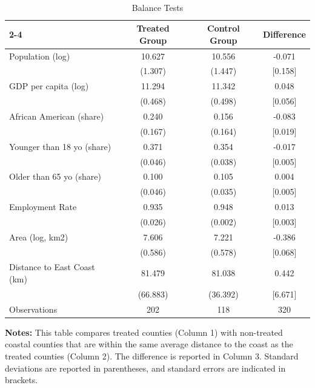 \documentclass{article}
\begin{document}
\begin{enumerate}
\begin{table}[b!]
\begin{center}
\caption{\sc Balance Tests}\\\vspace{.25cm}
\begin{tabular}{l|ccc|}
\cline{2-4}
 & Treated Group & Control Group & Difference \\ \hline
\multicolumn{1}{|l|}{Population (log)} & 10.627 & 10.556 & -0.071 \\
\multicolumn{1}{|l|}{} & (1.307) & (1.447) & {[}0.158{]} \\
\multicolumn{1}{|l|}{GDP per capita (log)} & 11.294 & 11.342 & 0.048 \\
\multicolumn{1}{|l|}{} & (0.468) & (0.498) & {[}0.056{]} \\
\multicolumn{1}{|l|}{African American (share)} & 0.240 & 0.156 & -0.083 \\
\multicolumn{1}{|l|}{} & (0.167) & (0.164) & {[}0.019{]} \\
\multicolumn{1}{|l|}{Younger than 18 yo (share)} & 0.371 & 0.354 & -0.017 \\
\multicolumn{1}{|l|}{} & (0.046) & (0.038) & {[}0.005{]} \\
\multicolumn{1}{|l|}{Older than 65 yo (share)} & 0.100 & 0.105 & 0.004 \\
\multicolumn{1}{|l|}{} & (0.046) & (0.035) & {[}0.005{]} \\
\multicolumn{1}{|l|}{Employment Rate} & 0.935 & 0.948 & 0.013 \\
\multicolumn{1}{|l|}{} & (0.026) & (0.002) & {[}0.003{]} \\
\multicolumn{1}{|l|}{Area (log, km2)} & 7.606 & 7.221 & -0.386 \\
\multicolumn{1}{|l|}{} & (0.586) & (0.578) & {[}0.068{]} \\
\multicolumn{1}{|l|}{Distance to East Coast (km)} & 81.479 & 81.038 & 0.442 \\
\multicolumn{1}{|l|}{} & (66.883) & (36.392) & {[}6.671{]} \\ \hline
\multicolumn{1}{|l|}{Observations} & 202 & 118 & 320 \\ \hline
\end{tabular}
\end{center}
\footnotesize{\textbf{Notes:} This table compares treated counties (Column 1) with non-treated coastal counties that are within the same average distance to the coast as the treated counties (Column 2). The difference is reported in Column 3. Standard deviations are reported in parentheses, and standard errors are indicated in brackets. \par \vspace{3cm}} 
\end{table}



\end{enumerate}
\end{document}
